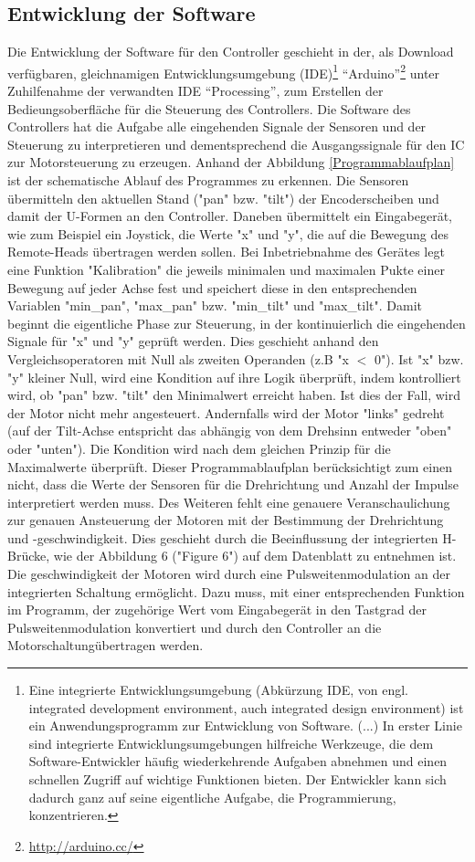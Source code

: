 \documentclass[a4paper, 12pt, bibtotocnumbered, liststotocnumbered]{scrartcl}
\begin{document}
	\subsection{Entwicklung der Software}
	Die Entwicklung der Software für den Controller geschieht in der, als Download verfügbaren, gleichnamigen Entwicklungsumgebung (IDE)\footnote{Eine integrierte Entwicklungsumgebung (Abkürzung IDE, von engl. integrated development environment, auch integrated design environment) ist ein Anwendungsprogramm zur Entwicklung von Software. (...) In erster Linie sind integrierte Entwicklungsumgebungen hilfreiche Werkzeuge, die dem Software-Entwickler häufig wiederkehrende Aufgaben abnehmen und einen schnellen Zugriff auf wichtige Funktionen bieten. Der Entwickler kann sich dadurch ganz auf seine eigentliche Aufgabe, die Programmierung, konzentrieren.} “Arduino”\footnote{\url{http://arduino.cc/}} unter Zuhilfenahme der verwandten IDE “Processing”, zum Erstellen der Bedieungsoberfläche für die Steuerung des Controllers.
	Die Software des Controllers hat die Aufgabe alle eingehenden Signale der Sensoren und der Steuerung zu interpretieren und dementsprechend die Ausgangssignale für den IC zur Motorsteuerung zu erzeugen.
	Anhand der Abbildung \ref{Programmablaufplan} ist der schematische Ablauf des Programmes zu erkennen. Die Sensoren übermitteln den aktuellen Stand ("pan" bzw. "tilt") der Encoderscheiben und damit der U-Formen an den Controller. Daneben übermittelt ein Eingabegerät, wie zum Beispiel ein Joystick, die Werte "x" und "y", die auf die Bewegung des Remote-Heads übertragen werden sollen. Bei Inbetriebnahme des Gerätes legt eine Funktion "Kalibration" die jeweils minimalen und maximalen Pukte einer Bewegung auf jeder Achse fest und speichert diese in den entsprechenden Variablen "min\_pan", "max\_pan" bzw. "min\_tilt" und "max\_tilt". Damit beginnt die eigentliche Phase zur Steuerung, in der kontinuierlich die eingehenden Signale für "x" und "y" geprüft werden. Dies geschieht anhand den Vergleichsoperatoren mit Null als zweiten Operanden (z.B "x $<$ 0"). Ist "x" bzw. "y" kleiner Null, wird eine Kondition auf ihre Logik überprüft, indem kontrolliert wird, ob "pan" bzw. "tilt" den Minimalwert erreicht haben. Ist dies der Fall, wird der Motor nicht mehr angesteuert. Andernfalls wird der Motor "links" gedreht (auf der Tilt-Achse entspricht das abhängig von dem Drehsinn entweder "oben" oder "unten"). Die Kondition wird nach dem gleichen Prinzip für die Maximalwerte überprüft.
	Dieser Programmablaufplan berücksichtigt zum einen nicht, dass die Werte der Sensoren für die Drehrichtung und Anzahl der Impulse interpretiert werden muss. Des Weiteren fehlt eine genauere Veranschaulichung zur genauen Ansteuerung der Motoren mit der Bestimmung der Drehrichtung und -geschwindigkeit. Dies geschieht durch die Beeinflussung der integrierten H-Brücke, wie der Abbildung 6 ("Figure 6") auf dem Datenblatt \cite{l298} zu entnehmen ist. Die geschwindigkeit der Motoren wird durch eine Pulsweitenmodulation an der integrierten Schaltung ermöglicht. Dazu muss, mit einer entsprechenden Funktion im Programm, der zugehörige Wert vom Eingabegerät in den Tastgrad\cite{wikipedia-tastgrad} der Pulsweitenmodulation konvertiert und durch den Controller an die Motorschaltungübertragen werden. 
\end{document}
